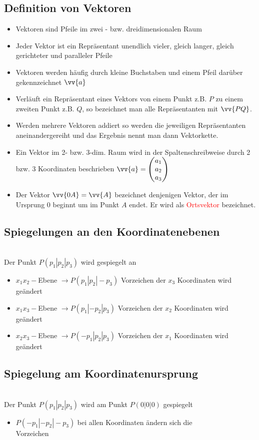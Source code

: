 \documentclass[a4paper,twocolumn,10pt]{onepgnote1}
\begin{document}
\subsection{Definition von Vektoren}
\begin{itemize}
    \item Vektoren sind Pfeile im zwei - bzw. dreidimensionalen Raum
    \item Jeder Vektor ist ein Repräsentant unendlich vieler, gleich langer, gleich gerichteter und paralleler Pfeile
    \item Vektoren werden häufig durch kleine Buchstaben und einem Pfeil darüber gekennzeichnet $\vv{a}$
    \item Verläuft ein Repräsentant eines Vektors von einem Punkt z.B. $P$ zu einem zweiten Punkt z.B. $Q$, so bezeichnet man alle Repräsentanten mit $\vv{PQ}$.
    \item Werden mehrere Vektoren addiert so werden die jeweiligen Repräsentanten aneinandergereiht und das Ergebnis nennt man dann Vektorkette.
    \item Ein Vektor im 2- bzw. 3-dim. Raum wird in der Spaltenschreibweise durch 2 bzw. 3 Koordinaten beschrieben $\vv{a}= \begin{pmatrix} a_1 \\ a_2 \\ a_3 \end{pmatrix}$
    \item Der Vektor \textcolor{red}{ $\vv{0A} = \vv{A}$} bezeichnet denjenigen Vektor, der im Ursprung $0$ beginnt um im Punkt $A$ endet. Er wird als \textcolor{red}{Ortsvektor} bezeichnet.
\end{itemize}
\subsection{Spiegelungen an den Koordinatenebenen}\\[0.25cm]
Der Punkt $P(p_1|p_2|p_3)$ wird gespiegelt an
\begin{itemize}
\item $x_1x_2-$Ebene $\longrightarrow P(p_1|p_2|-p_3)$ Vorzeichen der $x_3$ Koordinaten wird geändert
\item $x_1x_3-$Ebene $\longrightarrow P(p_1|-p_2|p_3)$ Vorzeichen der $x_2$ Koordinaten wird geändert
\item $x_2x_3-$Ebene $\longrightarrow P(-p_1|p_2|p_3)$ Vorzeichen der $x_1$ Koordinaten wird geändert
\end{itemize}
\subsection{Spiegelung am Koordinatenursprung}\\[0.25cm]
Der Punkt $P(p_1|p_2|p_3)$ wird am Punkt $P(0|0|0)$ gespiegelt 
\begin{itemize}
\item $P(-p_1|-p_2|-p_3)$ bei allen Koordinaten ändern sich die \\Vorzeichen
\end{itemize}
\end{document}
